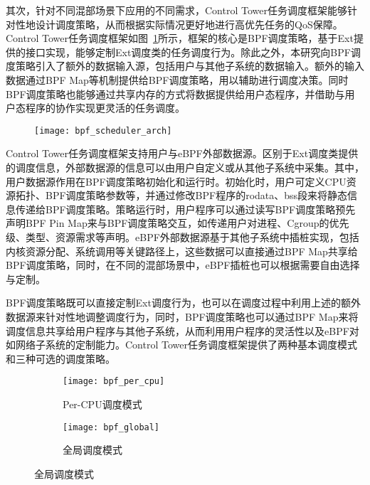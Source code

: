 其次，针对不同混部场景下应用的不同需求，Control Tower任务调度框架能够针对性地设计调度策略，从而根据实际情况更好地进行高优先任务的QoS保障。Control Tower任务调度框架如图~\ref{fig:bpf_scheduler_arch}所示，框架的核心是BPF调度策略，基于Ext提供的接口实现，能够定制Ext调度类的任务调度行为。除此之外，本研究向BPF调度策略引入了额外的数据输入源，包括用户与其他子系统的数据输入。额外的输入数据通过BPF Map等机制提供给BPF调度策略，用以辅助进行调度决策。同时BPF调度策略也能够通过共享内存的方式将数据提供给用户态程序，并借助与用户态程序的协作实现更灵活的任务调度。

\begin{figure}[H]
    \centering
    \texttt{[image: bpf\_scheduler\_arch]}
    \label{fig:bpf_scheduler_arch}
\end{figure}

Control Tower任务调度框架支持用户与eBPF外部数据源。区别于Ext调度类提供的调度信息，外部数据源的信息可以由用户自定义或从其他子系统中采集。其中，用户数据源作用在BPF调度策略初始化和运行时。初始化时，用户可定义CPU资源拓扑、BPF调度策略参数等，并通过修改BPF程序的rodata、bss段来将静态信息传递给BPF调度策略。策略运行时，用户程序可以通过读写BPF调度策略预先声明BPF Pin Map来与BPF调度策略交互，如传递用户对进程、Cgroup的优先级、类型、资源需求等声明。eBPF外部数据源基于其他子系统中插桩实现，包括内核资源分配、系统调用等关键路径上，这些数据可以直接通过BPF Map共享给BPF调度策略，同时，在不同的混部场景中，eBPF插桩也可以根据需要自由选择与定制。

BPF调度策略既可以直接定制Ext调度行为，也可以在调度过程中利用上述的额外数据源来针对性地调整调度行为，同时，BPF调度策略也可以通过BPF Map来将调度信息共享给用户程序与其他子系统，从而利用用户程序的灵活性以及eBPF对如网络子系统的定制能力。Control Tower任务调度框架提供了两种基本调度模式和三种可选的调度策略。


\begin{figure}[!htbp]
    \centering
    \begin{subfigure}[b]{0.49\textwidth}
        \texttt{[image: bpf\_per\_cpu]}
        \caption{Per-CPU调度模式}
        \label{fig:bpf_per_cpu}
    \end{subfigure}
    \begin{subfigure}[b]{0.49\textwidth}
        \texttt{[image: bpf\_global]}
        \caption{全局调度模式}
        \label{fig:bpf_global}
    \end{subfigure}
\label{fig:bpf_sched_mode}
\end{figure}

